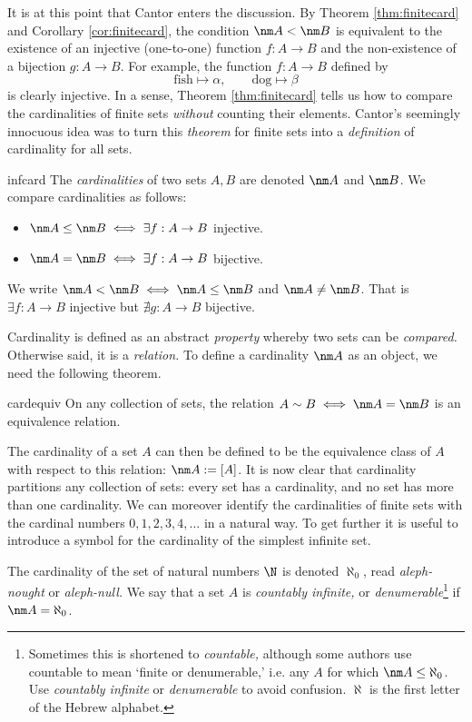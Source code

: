 It is at this point that Cantor enters the discussion. By Theorem \ref{thm:finitecard} and Corollary \ref{cor:finitecard}, the condition $\nm A<\nm B$ is equivalent to the existence of an injective (one-to-one) function $f:A\to B$ and the non-existence of a bijection $g:A\to B$. For example, the function $f:A\to B$ defined by
\[
	\text{fish}\longmapsto\alpha,\qquad\text{dog}\longmapsto\beta
\]
is clearly injective. In a sense, Theorem \ref{thm:finitecard} tells us how to compare the cardinalities of finite sets \emph{without} counting their elements. Cantor's seemingly innocuous idea was to turn this \emph{theorem} for finite sets into a \emph{definition} of cardinality for all sets.

\begin{defn}{}{infcard}
	The \emph{cardinalities} of two sets $A,B$ are denoted $\nm A$ and $\nm B$. We compare cardinalities as follows:
	\begin{itemize}
  	\item $\nm A\le\nm B\iff\exists f:A\to B$ injective.
  	\item $\nm A=\nm B\iff\exists f:A\to B$ bijective.
	\end{itemize}
	We write $\nm A<\nm B\iff \nm A\le \nm B$ and $\nm A\neq \nm B$. That is $\exists f:A\to B$ injective but $\nexists g:A\to B$ bijective.
\end{defn}

Cardinality is defined as an abstract \emph{property} whereby two sets can be \emph{compared.} Otherwise said, it is a \emph{relation.} To define a cardinality $\nm A$ as an object, we need the following theorem.

\begin{thm}{}{cardequiv}
	On any collection of sets, the relation $A\sim B\iff\nm A=\nm B$ is an equivalence relation.
\end{thm}

The cardinality of a set $A$ can then be defined to be the equivalence class of $A$ with respect to this relation: $\nm A:=[A]$. It is now clear that cardinality partitions any collection of sets: every set has a cardinality, and no set has more than one cardinality. We can moreover identify the cardinalities of finite sets with the cardinal numbers $0,1,2,3,4,\ldots$ in a natural way. To get further it is useful to introduce a symbol for the cardinality of the simplest infinite set.



\begin{defn}{}{}
	The cardinality of the set of natural numbers $\N$ is denoted $\aleph_0$, read \emph{aleph-nought} or \emph{aleph-null.} We say that a set $A$ is \emph{countably infinite,} or \emph{denumerable}\footnote{Sometimes this is shortened to \emph{countable,} although some authors use countable to mean `finite or denumerable,' i.e. any $A$ for which $\nm A\le\aleph_0$. Use \emph{countably infinite} or \emph{denumerable} to avoid confusion. $\aleph$ is the first letter of the Hebrew alphabet.} if $\nm A=\aleph_0$.
\end{defn}

